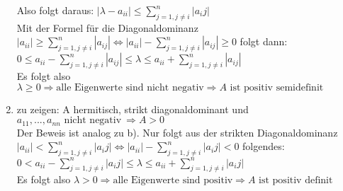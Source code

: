 \documentclass[ngerman]{article}
\begin{document}
\begin{enumerate}
Also folgt daraus: $|\lambda - a_{ii}| \le \sum_{j=1, j\neq i}^n |a_ij|$\\
Mit der Formel für die Diagonaldominanz $|a_{ii}| \ge \sum_{j=1, j\neq i}^n |a_{ij}| \Leftrightarrow |a_{ii}| - \sum_{j=1, j\neq i}^n |a_{ij}| \ge 0 $ folgt dann:\\
\newline
$0 \le a_{ii}-\sum_{j=1, j\neq i}^n |a_{ij}| \le \lambda \le a_{ii} + \sum_{j=1, j\neq i}^n |a_{ij}| $ \\
\newline
Es folgt also $\lambda \ge 0 \Rightarrow \text{alle Eigenwerte sind nicht negativ}\Rightarrow A \text{ ist positiv semidefinit}$
\newline

\item zu zeigen: A hermitisch, strikt diagonaldominant und $a_{11},...,a_{nn} \text{ nicht negativ}\ \Rightarrow A > 0$\\
\newline
Der Beweis ist analog zu b). Nur folgt aus der strikten Diagonaldominanz
$|a_{ii}| < \sum_{j=1, j\neq i}^n |a_ij| \Leftrightarrow |a_{ii}| - \sum_{j=1, j\neq i}^n |a_ij| < 0 $ folgendes:\\
\newline
$0 < a_{ii}-\sum_{j=1, j\neq i}^n |a_ij| \le \lambda \le a_{ii} + \sum_{j=1, j\neq i}^n |a_ij| $ \\
\newline
Es folgt also $\lambda > 0 \Rightarrow \text{alle Eigenwerte sind positiv}\Rightarrow A \text{ ist positiv definit}$
\end{enumerate}
\end{document}
